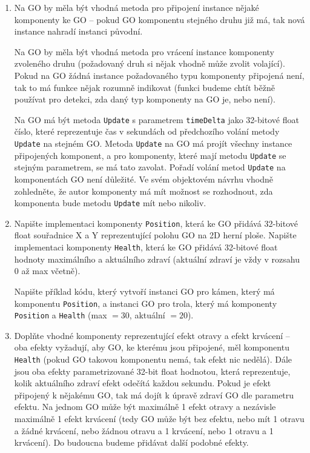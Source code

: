 \begin{enumerate}
\item Na GO by měla být vhodná metoda pro připojení instance nějaké komponenty ke GO --
  pokud GO komponentu stejného druhu již má, tak nová instance nahradí instanci původní.

  Na GO by měla být vhodná metoda pro vrácení instance komponenty zvoleného druhu
  (požadovaný druh si nějak vhodně může zvolit volající). Pokud na GO žádná instance
  požadovaného typu komponenty připojená není, tak to má funkce nějak rozumně indikovat
  (funkci budeme chtít běžně používat pro detekci, zda daný typ komponenty na GO je,
  nebo není).

  Na GO má být metoda \texttt{Update} s parametrem \texttt{timeDelta} jako 32-bitové
  float číslo, které reprezentuje čas v sekundách od předchozího volání metody
  \texttt{Update} na stejném GO. Metoda \texttt{Update} na GO má projít všechny instance
  připojených komponent, a pro komponenty, které mají metodu \texttt{Update} se stejným
  parametrem, se má tato zavolat. Pořadí volání metod \texttt{Update} na komponentách GO
  není důležité. Ve svém objektovém návrhu vhodně zohledněte, že autor komponenty má mít
  možnost se rozhodnout, zda komponenta bude metodu \texttt{Update} mít nebo nikoliv.

\item Napište implementaci komponenty \texttt{Position}, která ke GO přidává 32-bitové
  float souřadnice X a Y reprezentující polohu GO na 2D herní ploše. Napište implementaci
  komponenty \texttt{Health}, která ke GO přidává 32-bitové float hodnoty maximálního
  a aktuálního zdraví (aktuální zdraví je vždy v rozsahu 0 až max včetně).

  Napište příklad kódu, který vytvoří instanci GO pro kámen, který má komponentu
  \texttt{Position}, a instanci GO pro trola, který má komponenty \texttt{Position}
  a \texttt{Health} (max $=30$, aktuální $=20$).

\item Doplňte vhodné komponenty reprezentující efekt otravy a efekt krvácení -- oba
  efekty vyžadují, aby GO, ke kterému jsou připojené, měl komponentu \texttt{Health}
  (pokud GO takovou komponentu nemá, tak efekt nic nedělá). Dále jsou oba efekty
  parametrizované 32-bit float hodnotou, která reprezentuje, kolik aktuálního zdraví
  efekt odečítá každou sekundu. Pokud je efekt připojený k nějakému GO, tak má dojít
  k úpravě zdraví GO dle parametru efektu. Na jednom GO může být maximálně 1 efekt
  otravy a nezávisle maximálně 1 efekt krvácení (tedy GO může být bez efektu, nebo mít
  1 otravu a žádné krvácení, nebo žádnou otravu a 1 krvácení, nebo 1 otravu a 1 krvácení).
  Do budoucna budeme přidávat další podobné efekty.


\end{enumerate}
